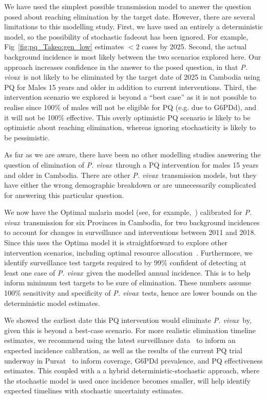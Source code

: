 \documentclass[doublespacing]{bmcart}
\newcommand{\pv}{\textit{P. vivax}}
\begin{document}
We have used the simplest possible transmission model to answer the question posed about reaching elimination by the target date. However, there are several limitations to this modelling study. First, we have used an entirely a deterministic model, so the possibility of stochastic fadeout has been ignored. For example, Fig~\ref{fig:pq_Takeo:gen_low} estimates $<2$ cases by 2025. Second, the actual background incidence is most likely between the two scenarios explored here. Our approach increases confidence in the answer to the posed question, in that \pv~is not likely to be eliminated by the target date of 2025 in Cambodia using PQ for Males 15 years and older in addition to current interventions. Third, the intervention scenario we explored is beyond a ``best case'' as it is not possible to realise since 100\% of males will not be eligible for PQ (e.g. due to G6PDd), and it will not be 100\% effective. This overly optimistic PQ scenario is likely to be optimistic about reaching elimination, whereas ignoring stochasticity is likely to be pessimistic. 

As far as we are aware, there have been no other modelling studies answering the question of elimination of \pv~through a PQ intervention for males 15 years and older in Cambodia. There are other \pv~transmission models, but they have either the wrong demographic breakdown or are unnecessarily complicated for answering this particular question.

We now have the Optimal malaria model (see, for example,~\cite{scott}) calibrated for \pv~transmission for six Provinces in Cambodia, for two background incidences to account for changes in surveillance and interventions between 2011 and 2018. Since this uses the Optima model it is straightforward to explore other intervention scenarios, including optimal resource allocation~\cite{optima}.
% 
Furthermore, we identify surveillance test targets required to by 99\% confident of detecting at least one case of \pv~given the modelled annual incidence. This is to help inform minimum test targets to be sure of elimination. These numbers assume 100\% sensitivity and specificity of \pv~tests, hence are lower bounds on the deterministic model estimates.

 We showed the earliest date this PQ intervention would eliminate \pv~by, given this is beyond a best-case scenario. For more realistic elimination timeline estimates, we recommend using the latest surveillance data~\cite{pengby_mobile} to inform an expected incidence calibration, as well as the results of the current PQ trial underway in Pursat~\cite{CNM_trial} to inform coverage, G6PDd prevalence, and PQ effectiveness estimates. This coupled with a a hybrid deterministic-stochastic approach, where the stochastic model is used once incidence becomes smaller, will help identify expected timelines with stochastic uncertainty estimates. 
\end{document}
